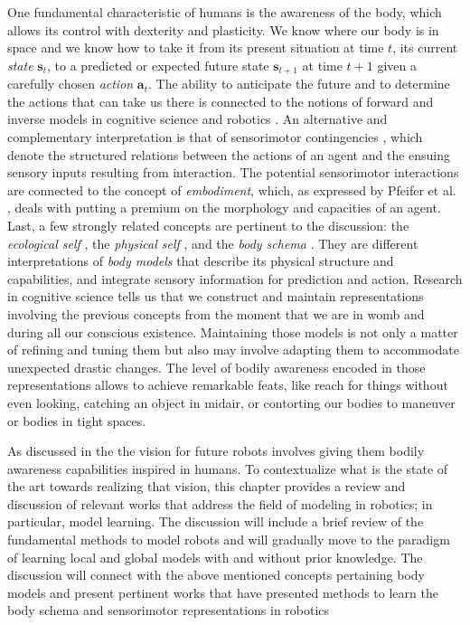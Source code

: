 One fundamental characteristic of humans is the awareness of the body, which allows its control with dexterity and plasticity. We know where our body is in space and we know how to take it from its present situation at time $t$, its current \textit{state} $\bm{s}_t$, to a predicted or expected future state $\bm{s}_{t+1}$ at time $t+1$ given a carefully chosen \textit{action} $\bm{a}_t$. The ability to anticipate the future and to determine the actions that can take us there is connected to the notions of forward and inverse models in cognitive science and robotics \cite{Kawato1999Internalmodelsmotor,Pierella2019dynamicsmotorlearning,NguyenTuong2011Modellearningrobot}. An alternative and complementary interpretation is that of sensorimotor contingencies \cite{Maye2013Extendingsensorimotorcontingency,Jacquey2019Sensorimotorcontingenciesas,Buhrmann2013dynamicalsystemsaccount}, which denote the structured relations between the actions of an agent and the ensuing sensory inputs resulting from interaction. The potential sensorimotor interactions are connected to the concept of \textit{embodiment}, which, as expressed by Pfeifer et al. \cite{Pfeifer2006Howbodyshapes}, deals with  putting a premium on the morphology and capacities of an agent. Last, a few strongly related concepts are pertinent to the discussion: the \textit{ecological self} , the \textit{physical self} , and the \textit{body schema} . They are different interpretations of \textit{body models} that describe its physical structure and capabilities, and integrate sensory information for prediction and action. Research in cognitive science tells us that we construct and maintain representations involving the previous concepts from the moment that we are in womb and during all our conscious existence. Maintaining those models is not only a matter of refining and tuning them but also may involve adapting them to accommodate unexpected drastic changes. The level of bodily awareness encoded in those representations allows to achieve remarkable feats, like reach for things without even looking, catching an object in midair, or contorting our bodies to maneuver or bodies in tight spaces.

As discussed in the  the vision for future robots involves giving them bodily awareness capabilities inspired in humans. To contextualize what is the state of the art towards realizing that vision, this chapter provides a review and discussion of relevant works that address the field of modeling in robotics; in particular, model learning. The discussion will include a brief review of the fundamental methods to model robots and will gradually move to the paradigm of learning local and global models with and without prior knowledge. The discussion will connect with the above mentioned concepts pertaining body models and present pertinent works that have presented methods to learn the body schema and sensorimotor representations in robotics

